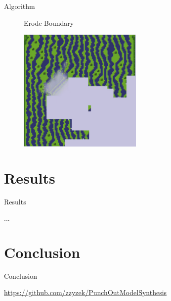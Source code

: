 \documentclass{beamer}
\begin{document}
  \begin{frame}[fragile]{Algorithm}

    \begin{figure}
      Erode Boundary

      \includegraphics[width=6cm]{img/fm_0036.pdf}
    \end{figure}
  \end{frame}

%

  \section{Results}

  \begin{frame}[fragile]{Results}

    ...

  \end{frame}

  \section{Conclusion}

  \begin{frame}[fragile]{Conclusion}

    \begin{center}\url{https://github.com/zzyzek/PunchOutModelSynthesis}\end{center}

  \end{frame}
\end{document}
